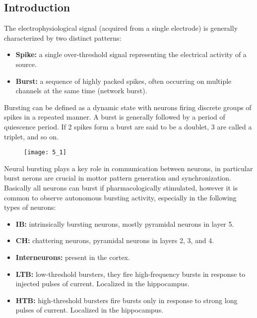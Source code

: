 \subsection{Introduction}
The electrophysiological signal (acquired from a single electrode) is generally
characterized by two distinct patterns:
\begin{itemize}
    \item \textbf{Spike:} a single over-threshold signal representing the
    electrical activity of a source.
    \item \textbf{Burst:} a sequence of highly packed spikes, often occurring on
    multiple channels at the same time (network burst).
\end{itemize}
Bursting can be defined as a dynamic state with neurons firing discrete groups of
spikes in a repeated manner. A burst is generally followed by a period of quiescence
period. If 2 spikes form a burst are said to be a doublet, 3 are called a triplet,
and so on.
\begin{figure}[H]
    \texttt{[image: 5\_1]}
    \centering
\end{figure}
Neural bursting plays a key role in communication between neurons, in particular
burst nerons are crucial in mottor pattern generation and synchronization.
Basically all neurons can burst if pharmacologically stimulated, however
it is common to observe autonomous bursting activity, especially in the following
types of neurons:
\begin{itemize}
    \item \textbf{IB:} intrinsically bursting neurons, mostly pyramidal neurons in
    layer 5.
    \item \textbf{CH:} chattering neurons, pyramidal neurons in layers 2, 3, and 4.
    \item \textbf{Interneurons:} present in the cortex.
    \item \textbf{LTB:} low-threshold bursters, they fire high-frequency bursts in
    response to injected pulses of current. Localized in the hippocampus.
    \item \textbf{HTB:} high-threshold bursters fire bursts only in response to
    strong long pulses of current. Localized in the hippocampus.
\end{itemize}
